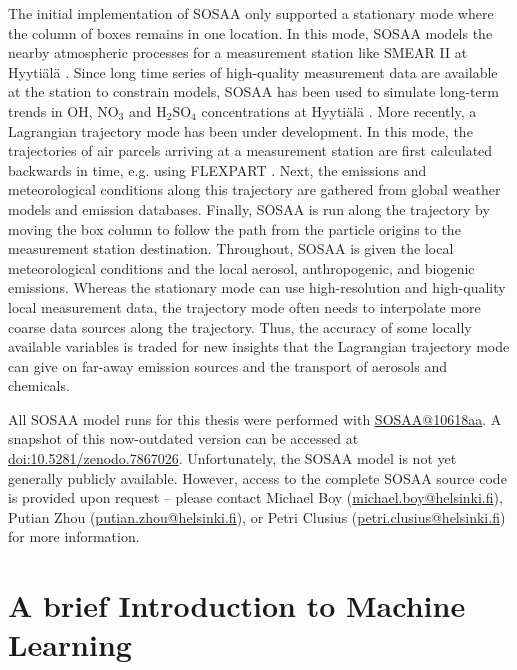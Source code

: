 \noindent The initial implementation of SOSAA only supported a stationary mode where the column of boxes remains in one location. In this mode, SOSAA models the nearby atmospheric processes for a measurement station like SMEAR II at Hyyti\"al\"a \cite{smear-station-2013}. Since long time series of high-quality measurement data are available at the station to constrain models, SOSAA has been used to simulate long-term trends in $\text{OH}$, $\text{NO}_3$ and $\text{H}_2\text{SO}_4$ concentrations at Hyyti\"al\"a \cite{sosaa-trends-2021}. More recently, a Lagrangian trajectory mode has been under development. In this mode, the trajectories of air parcels arriving at a measurement station are first calculated backwards in time, e.g. using FLEXPART \cite{flexpart-validation-1998, flexpart-correction-1999, flexpart-6.2-2005, flexpart-10.4-2019}. Next, the emissions and meteorological conditions along this trajectory are gathered from global weather models and emission databases. Finally, SOSAA is run along the trajectory by moving the box column to follow the path from the particle origins to the measurement station destination. Throughout, SOSAA is given the local meteorological conditions and the local aerosol, anthropogenic, and biogenic emissions. Whereas the stationary mode can use high-resolution and high-quality local measurement data, the trajectory mode often needs to interpolate more coarse data sources along the trajectory. Thus, the accuracy of some locally available variables is traded for new insights that the Lagrangian trajectory mode can give on far-away emission sources and the transport of aerosols and chemicals.

\newpar All SOSAA model runs for this thesis were performed with \href{https://version.helsinki.fi/putian.zhou/sosaa/-/tree/10618aa98c7470546308adf132afb0bc0735b4eb}{SOSAA@10618aa}. A snapshot of this now-outdated version can be accessed at \href{https://doi.org/10.5281/zenodo.7867026}{doi:10.5281/zenodo.7867026}. Unfortunately, the SOSAA model is not yet generally publicly available. However, access to the complete SOSAA source code is provided upon request -- please contact Michael Boy (\href{mailto:michael.boy@helsinki.fi}{michael.boy@helsinki.fi}), Putian Zhou (\href{mailto:putian.zhou@helsinki.fi}{putian.zhou@helsinki.fi}), or Petri Clusius (\href{mailto:petri.clusius@helsinki.fi}{petri.clusius@helsinki.fi}) for more information.

\section{A brief Introduction to Machine Learning} \label{txt:machine-learning}

